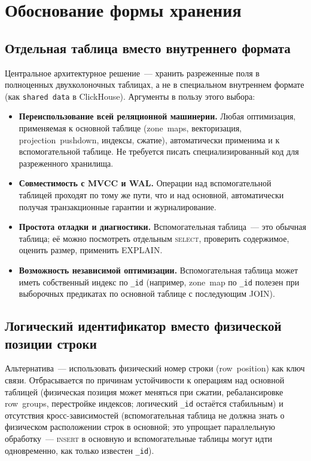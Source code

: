 \section{Обоснование формы хранения}

\subsection{Отдельная таблица вместо внутреннего формата}

Центральное архитектурное решение~--- хранить разреженные поля в
полноценных двухколоночных таблицах, а не в специальном внутреннем
формате (как \texttt{shared~data} в ClickHouse). Аргументы в пользу
этого выбора:

\begin{itemize}
    \item \textbf{Переиспользование всей реляционной машинерии.}
    Любая оптимизация, применяемая к основной таблице
    (zone~maps, векторизация, projection~pushdown, индексы,
    сжатие), автоматически применима и к вспомогательной таблице.
    Не требуется писать специализированный код для разреженного
    хранилища.
    \item \textbf{Совместимость с MVCC и WAL.} Операции над
    вспомогательной таблицей проходят по тому же пути, что и над
    основной, автоматически получая транзакционные гарантии и
    журналирование.
    \item \textbf{Простота отладки и диагностики.}
    Вспомогательная таблица~--- это обычная таблица; её можно
    посмотреть отдельным \textsc{select}, проверить содержимое,
    оценить размер, применить EXPLAIN.
    \item \textbf{Возможность независимой оптимизации.}
    Вспомогательная таблица может иметь собственный индекс по
    \texttt{\_id} (например, zone~map по \texttt{\_id} полезен
    при выборочных предикатах по основной таблице с последующим
    JOIN).
\end{itemize}

\subsection{Логический идентификатор вместо физической позиции строки}

Альтернатива~--- использовать физический номер строки
(row~position) как ключ связи. Отбрасывается по причинам
устойчивости к операциям над основной таблицей (физическая позиция
может меняться при сжатии, ребалансировке row~groups, перестройке
индексов; логический \texttt{\_id} остаётся стабильным) и
отсутствия кросс-зависимостей (вспомогательная таблица не должна
знать о физическом расположении строк в основной; это упрощает
параллельную обработку~--- \textsc{insert} в основную и
вспомогательные таблицы могут идти одновременно, как только известен
\texttt{\_id}).

